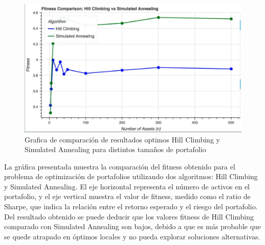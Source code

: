 \documentclass[9pt,a4paper,twoside]{rho-class/rho}
\begin{document}
        \begin{figure}[h]
            \centering
            \includegraphics[width=\linewidth]{figures/exe_fitness.pdf}
            \caption{Grafica de comparación de resultados optimos Hill Climbing y Simulated Annealing para distintos tamaños de portafolio}
            \label{fig:sample_figure}
        \end{figure}

        La gráfica presentada muestra la comparación del fitness obtenido para el problema de optimización de portafolios utilizando dos algoritmos: Hill Climbing y Simulated Annealing. El eje horizontal representa el número de activos en el portafolio, y el eje vertical muestra el valor de fitness, medido como el ratio de Sharpe, que indica la relación entre el retorno esperado y el riesgo del portafolio. Del resultado obtenido se puede deducir que los valores fitness de Hill Climbing comparado con Simulated Annealing son bajos, debido a que es más probable que se quede atrapado en óptimos locales y no pueda explorar soluciones alternativas.
        



\end{document}
